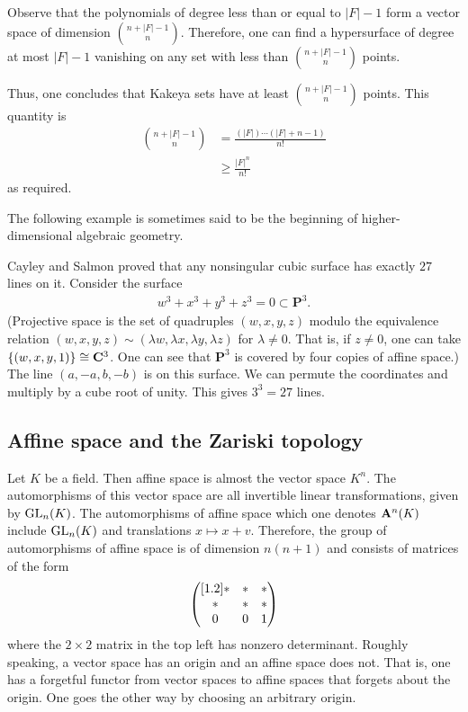 \documentclass[11pt, oneside,margin=1in]{article}
\begin{document}
Observe that the polynomials of degree less than or equal to $\left\lvert F \right\rvert -1$ form a vector space of dimension $\binom{n+\left\lvert F \right\rvert -1}{n}$. Therefore, one can find a hypersurface of degree at most $\left\lvert F \right\rvert -1$ vanishing on any set with less than $\binom{n+\left\lvert F \right\rvert -1}{n}$ points.

Thus, one concludes that Kakeya sets have at least $\binom{n+\left\lvert F \right\rvert -1}{n}$ points. This quantity is 
\begin{align*}
	\binom{n+\left\lvert F \right\rvert -1}{n} &= \frac{(\left\lvert F \right\rvert ) \cdots (\left\lvert F \right\rvert +n-1)}{n!} \\
						   &\ge \frac{\left\lvert F \right\rvert ^n}{n!}
\end{align*}
as required.

The following example is sometimes said to be the beginning of higher-dimensional algebraic geometry.

\begin{example}\label{}\text{}
Cayley and Salmon proved that any nonsingular cubic surface has exactly $27$ lines on it. Consider the surface
\begin{align*}
	w^3 + x^3 +y^3 + z^3 = 0 \subset \mathbf{P}^3.
\end{align*}
(Projective space is the set of quadruples $(w,x,y,z)$ modulo the equivalence relation $(w,x,y,z)\sim  (\lambda w, \lambda x, \lambda y,\lambda z)$ for $\lambda\ne 0$. That is, if $z\ne 0$, one can take $\{(w,x,y,1)\} \cong  \mathbf{C}^3$. One can see that $\mathbf{P}^3$ is covered by four copies of affine space.) The line $(a,-a,b,-b)$ is on this surface. We can permute the coordinates and multiply by a cube root of unity. This gives $3^3 = 27$ lines.  
\end{example}

\subsection{Affine space and the Zariski topology}
Let $K$ be a field. Then affine space is almost the vector space $K^n$. The automorphisms of this vector space are all invertible linear transformations, given by $\operatorname{GL}_{n}(K)$. The automorphisms of affine space which one denotes $\mathbf{A}^n(K)$ include $\operatorname{GL}_{n}(K)$ and translations $x \longmapsto x+v$. Therefore, the group of automorphisms of affine space is of dimension $n(n+1)$ and consists of matrices of the form
\begin{align*}
	\begin{pmatrix} [ 1.2 ] *&*&*\\ \text{}*&*&*\\0&0&1\end{pmatrix}
\end{align*}
where the $2\times 2$ matrix in the top left has nonzero determinant. Roughly speaking, a vector space has an origin and an affine space does not. That is, one has a forgetful functor from vector spaces to affine spaces that forgets about the origin. One goes the other way by choosing an arbitrary origin. 
\end{document}
